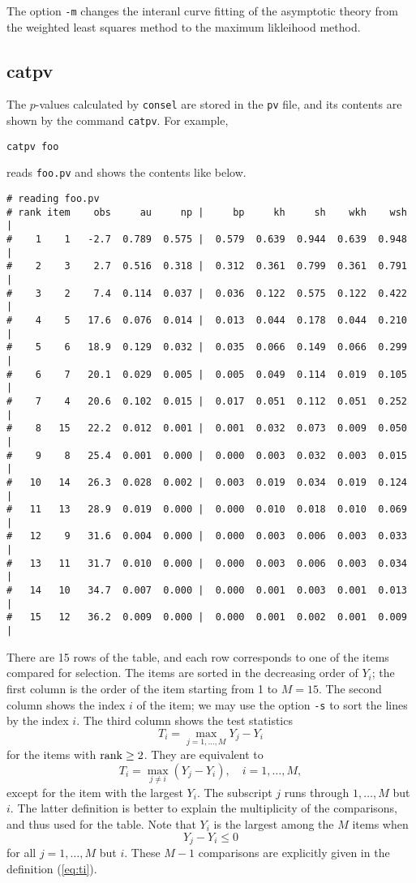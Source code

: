 \documentclass[12pt]{article}
\newcommand{\refeq}[1]{(\ref{eq:#1})}
\begin{document}
The option {\tt -m} changes the interanl curve fitting of the asymptotic
theory from the weighted least squares method to the maximum likleihood
method.


\subsection{catpv}

The $p$-values calculated by {\tt consel} are stored in the {\tt pv}
file, and its contents are shown by the command {\tt catpv}. For
example,
\begin{verbatim}
catpv foo
\end{verbatim}
reads {\tt foo.pv} and shows the contents like below.
{\small
\begin{verbatim}
# reading foo.pv
# rank item    obs     au     np |     bp     kh     sh    wkh    wsh |
#    1    1   -2.7  0.789  0.575 |  0.579  0.639  0.944  0.639  0.948 |
#    2    3    2.7  0.516  0.318 |  0.312  0.361  0.799  0.361  0.791 |
#    3    2    7.4  0.114  0.037 |  0.036  0.122  0.575  0.122  0.422 |
#    4    5   17.6  0.076  0.014 |  0.013  0.044  0.178  0.044  0.210 |
#    5    6   18.9  0.129  0.032 |  0.035  0.066  0.149  0.066  0.299 |
#    6    7   20.1  0.029  0.005 |  0.005  0.049  0.114  0.019  0.105 |
#    7    4   20.6  0.102  0.015 |  0.017  0.051  0.112  0.051  0.252 |
#    8   15   22.2  0.012  0.001 |  0.001  0.032  0.073  0.009  0.050 |
#    9    8   25.4  0.001  0.000 |  0.000  0.003  0.032  0.003  0.015 |
#   10   14   26.3  0.028  0.002 |  0.003  0.019  0.034  0.019  0.124 |
#   11   13   28.9  0.019  0.000 |  0.000  0.010  0.018  0.010  0.069 |
#   12    9   31.6  0.004  0.000 |  0.000  0.003  0.006  0.003  0.033 |
#   13   11   31.7  0.010  0.000 |  0.000  0.003  0.006  0.003  0.034 |
#   14   10   34.7  0.007  0.000 |  0.000  0.001  0.003  0.001  0.013 |
#   15   12   36.2  0.009  0.000 |  0.000  0.001  0.002  0.001  0.009 |
\end{verbatim}
}

There are 15 rows of the table, and each row corresponds to one of the
items compared for selection. The items are sorted in the decreasing
order of $Y_i$; the first column is the order of the item starting from
1 to $M=15$.  The second column shows the index $i$ of the item; we may
use the option {\tt -s} to sort the lines by the index $i$.  The third
column shows the test statistics \[ T_i = \max_{j=1,\ldots,M} Y_j - Y_i
\] for the items with ${\rm rank} \ge 2$. They are equivalent to
\begin{equation}
 T_i = \max_{j\neq i} (Y_j - Y_i), \quad i=1,\ldots,M, \label{eq:ti}
\end{equation}
except for the item with the largest $Y_i$. The subscript $j$ runs
through $1,\ldots,M$ but $i$. The latter definition is better to explain
the multiplicity of the comparisons, and thus used for the table. Note
that $Y_i$ is the largest among the $M$ items when \[ Y_j - Y_i \le 0 \]
for all $j=1,\ldots,M$ but $i$. These $M-1$ comparisons are explicitly
given in the definition \refeq{ti}.
\end{document}
